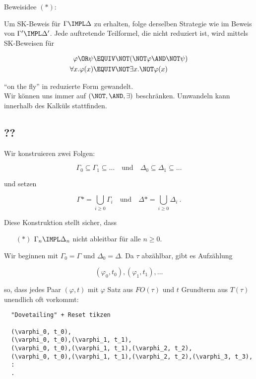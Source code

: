 Beweisidee $(*)$:

Um SK-Beweis für $\Gamma\IMPL\Delta$ zu erhalten, folge derselben Strategie wie im
Beweis von $\Gamma'\IMPL\Delta'$. Jede auftretende Teilformel, die nicht reduziert
ist, wird mittels SK-Beweisen für

\begin{align*}
  \varphi \OR \psi &\EQUIV \NOT(\NOT\varphi \AND \NOT\psi) \\
  \forall x.\varphi(x) &\EQUIV \NOT\exists x.\NOT\varphi(x)
\end{align*}

\enquote{on the fly} in reduzierte Form gewandelt.\\
Wir können uns immer auf $(\NOT,\AND,\exists)$ beschränken. Umwandeln kann innerhalb des Kalküls stattfinden.
\subsection{??}

Wir konstruieren zwei Folgen:

\[ \Gamma_0 \subseteq \Gamma_1 \subseteq \dots \quad \text{und} \quad \Delta_0 \subseteq \Delta_1 \subseteq \dots \]

und setzen

\[ \Gamma* = \bigcup_{i\geq 0} \Gamma_i \quad \text{und} \quad \Delta* = \bigcup_{i\geq 0} \Delta_i\ \text{.} \]

Diese Konstruktion stellt sicher, dass

\begin{itemize}
  \item[$(*)$] $\Gamma_n \IMPL \Delta_n$ nicht ableitbar für alle $n\geq 0$.
\end{itemize}

Wir beginnen mit $\Gamma_0=\Gamma$ und $\Delta_0=\Delta$. Da $\tau$
abzählbar, gibt es Aufzählung

\[
  (\varphi_0, t_0), (\varphi_1, t_1), \dots
\]

so, dass jedes Paar $(\varphi,t)$ mit $\varphi$ Satz aus $FO(\tau)$ und $t$ Grundterm
aus $T(\tau)$ unendlich oft vorkommt:

\begin{verbatim}
  "Dovetailing" + Reset tikzen
  
  (\varphi_0, t_0),
  (\varphi_0, t_0),(\varphi_1, t_1),
  (\varphi_0, t_0),(\varphi_1, t_1),(\varphi_2, t_2),
  (\varphi_0, t_0),(\varphi_1, t_1),(\varphi_2, t_2),(\varphi_3, t_3),
  :
  .
\end{verbatim}

